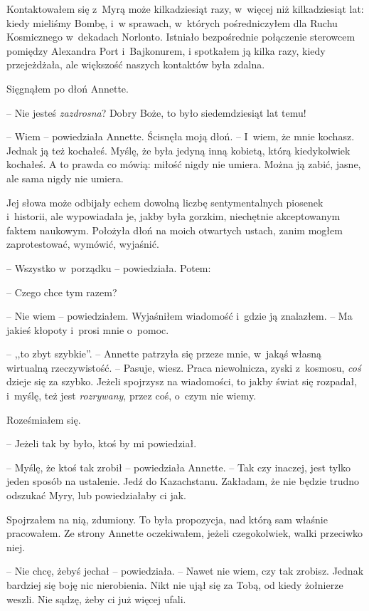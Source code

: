 \documentclass[oneside,polish,11pt,sfheadings]{mwbk}
\begin{document}
Kontaktowałem się z~Myrą może kilkadziesiąt razy, w~więcej niż
kilkadziesiąt lat: kiedy mieliśmy Bombę, i~w sprawach, w~których
pośredniczyłem dla Ruchu Kosmicznego w~dekadach Norlonto. Istniało
bezpośrednie połączenie sterowcem pomiędzy Alexandra Port i~Bajkonurem,
i spotkałem ją kilka razy, kiedy przejeżdżała, ale większość naszych
kontaktów była zdalna.

Sięgnąłem po dłoń Annette. 

-- Nie jesteś \emph{zazdrosna}? Dobry Boże, to
było siedemdziesiąt lat temu!

-- Wiem -- powiedziała Annette. Ścisnęła moją dłoń. -- I~wiem, że mnie
kochasz. Jednak ją też kochałeś. Myślę, że była jedyną inną kobietą,
którą kiedykolwiek kochałeś. A to prawda co mówią: miłość nigdy nie
umiera. Można ją zabić, jasne, ale sama nigdy nie umiera.

Jej słowa może odbijały echem dowolną liczbę sentymentalnych piosenek i~historii, ale wypowiadała je, jakby była gorzkim, niechętnie
akceptowanym faktem naukowym. Położyła dłoń na moich otwartych ustach,
zanim mogłem zaprotestować, wymówić, wyjaśnić.

-- Wszystko w~porządku -- powiedziała. Potem: 

-- Czego chce tym razem?

-- Nie wiem -- powiedziałem. Wyjaśniłem wiadomość i~gdzie ją znalazłem. -- Ma jakieś kłopoty i~prosi mnie o~pomoc.

-- ,,to zbyt szybkie''. -- Annette patrzyła się przeze mnie, w~jakąś własną
wirtualną rzeczywistość. -- Pasuje, wiesz. Praca niewolnicza, zyski z~kosmosu, \emph{coś }dzieje się za szybko. Jeżeli spojrzysz na
wiadomości, to jakby świat się rozpadał, i~myślę, też jest
\emph{rozrywany}, przez coś, o~czym nie wiemy.

Roześmiałem się. 

-- Jeżeli tak by było, ktoś by mi powiedział.

-- Myślę, że ktoś tak zrobił -- powiedziała Annette. -- Tak czy inaczej,
jest tylko jeden sposób na ustalenie. Jedź do Kazachstanu. Zakładam, że
nie będzie trudno odszukać Myry, lub powiedziałaby ci jak.

Spojrzałem na nią, zdumiony. To była propozycja, nad którą sam właśnie
pracowałem. Ze strony Annette oczekiwałem, jeżeli czegokolwiek, walki
przeciwko niej.

-- Nie chcę, żebyś jechał -- powiedziała. -- Nawet nie wiem, czy tak
zrobisz. Jednak bardziej się boję nic nierobienia. Nikt nie ujął się za
Tobą, od kiedy żołnierze weszli. Nie sądzę, żeby ci już więcej ufali.
\end{document}
